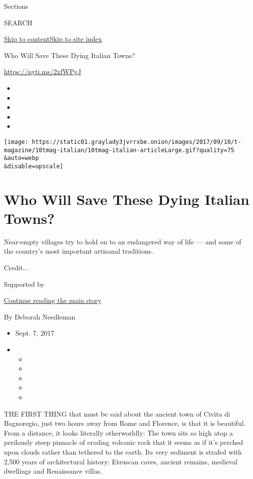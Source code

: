 Sections

SEARCH

\protect\hyperlink{site-content}{Skip to
content}\protect\hyperlink{site-index}{Skip to site index}

Who Will Save These Dying Italian Towns?

\url{https://nyti.ms/2xfWPgJ}

\begin{itemize}
\item
\item
\item
\item
\item
\end{itemize}

\texttt{[image: https://static01.graylady3jvrrxbe.onion/images/2017/09/10/t-magazine/10tmag-italian/10tmag-italian-articleLarge.gif?quality=75\\\&auto=webp\\\&disable=upscale]}

\hypertarget{who-will-save-these-dying-italian-towns}{%
\section{Who Will Save These Dying Italian
Towns?}\label{who-will-save-these-dying-italian-towns}}

Near-empty villages try to hold on to an endangered way of life --- and
some of the country's most important artisanal traditions.

Credit...

Supported by

\protect\hyperlink{after-sponsor}{Continue reading the main story}

By Deborah Needleman

\begin{itemize}
\item
  Sept. 7, 2017
\item
  \begin{itemize}
  \item
  \item
  \item
  \item
  \item
  \end{itemize}
\end{itemize}

THE FIRST THING that must be said about the ancient town of Civita di
Bagnoregio, just two hours away from Rome and Florence, is that it is
beautiful. From a distance, it looks literally otherworldly: The town
sits so high atop a perilously steep pinnacle of eroding volcanic rock
that it seems as if it's perched upon clouds rather than tethered to the
earth. Its very sediment is strafed with 2,500 years of architectural
history: Etruscan caves, ancient remains, medieval dwellings and
Renaissance villas.

